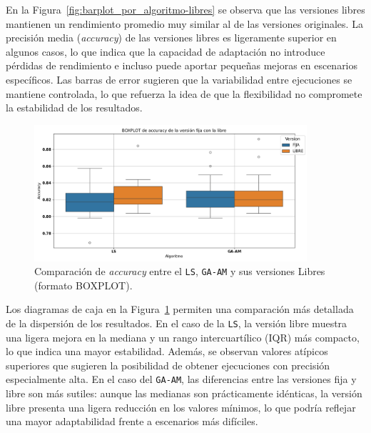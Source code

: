 En la Figura~\ref{fig:barplot_por_algoritmo-libres} se observa que las versiones libres mantienen un rendimiento promedio muy similar al de las versiones originales.
La precisión media (\textit{accuracy}) de las versiones libres es ligeramente superior en algunos casos,
lo que indica que la capacidad de adaptación no introduce pérdidas de rendimiento e incluso puede aportar pequeñas mejoras en escenarios específicos.
Las barras de error sugieren que la variabilidad entre ejecuciones se mantiene controlada,
lo que refuerza la idea de que la flexibilidad no compromete la estabilidad de los resultados.


\begin{figure}[htp]
    \centering
    \includegraphics[width=0.9\textwidth]{imagenes/evaluaciones/libres/boxplot_por_algoritmo.png}
    \caption{Comparación de \textit{accuracy} entre el \texttt{LS}, \texttt{GA-AM} y sus versiones Libres (formato BOXPLOT).}
    \label{fig:boxplot_por_algoritmo-libres}
\end{figure}

Los diagramas de caja en la Figura~\ref{fig:boxplot_por_algoritmo-libres} permiten una comparación más detallada de la dispersión de los resultados.
En el caso de la \texttt{LS}, la versión libre muestra una ligera mejora en la mediana y un rango intercuartílico (IQR) más compacto, lo que indica una mayor estabilidad.
Además, se observan valores atípicos superiores que sugieren la posibilidad de obtener ejecuciones con precisión especialmente alta.
En el caso del \texttt{GA-AM}, las diferencias entre las versiones fija y libre son más sutiles: aunque las medianas son prácticamente idénticas,
la versión libre presenta una ligera reducción en los valores mínimos, lo que podría reflejar una mayor adaptabilidad frente a escenarios más difíciles.


